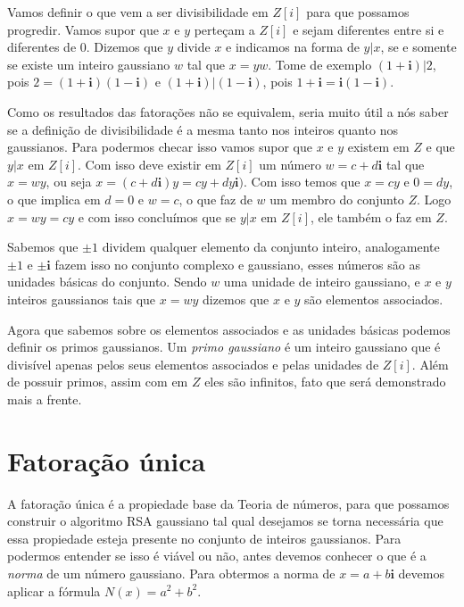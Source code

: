 Vamos definir o que vem a ser divisibilidade em $Z[i]$ para que possamos progredir. Vamos supor que $x$ e $y$ perte\c{c}am a $Z[i]$ e sejam diferentes entre si e diferentes de $0$. Dizemos que $y$ divide $x$ e indicamos na forma de $y|x$, se e somente se existe um inteiro gaussiano $w$ tal que $x=yw$. Tome de exemplo $(1 + \textbf{i})|2$, pois $ 2 = (1 + \textbf{i})(1 - \textbf{i})$ e $(1 + \textbf{i})|(1 - \textbf{i})$, pois $ 1 + \textbf{i} = \textbf{i}(1 - \textbf{i})$.

Como os resultados das fatora\c{c}\~oes n\~ao se equivalem, seria muito \'util a n\'os saber se a defini\c{c}\~ao de divisibilidade \'e a mesma tanto nos inteiros quanto nos gaussianos. Para podermos checar isso vamos supor que $x$ e $y$ existem em $Z$ e que $y|x$ em $Z[i]$. Com isso deve existir em $Z[i]$ um n\'umero $w = c + d\textbf{i}$ tal que $x=wy$, ou seja $x=(c + d\textbf{i})y = cy + dy\textbf{i})$. Com isso temos que $x=cy$ e $0 = dy$, o que implica em $d = 0$ e $w=c$, o que faz de $w$ um membro do conjunto $Z$. Logo $x=wy=cy$ e com isso conclu\'imos que se $y|x$ em $Z[i]$, ele tamb\'em o faz em $Z$.

Sabemos que $\pm 1$ dividem qualquer elemento da conjunto inteiro, analogamente $\pm 1$ e $\pm \textbf{i}$ fazem isso no conjunto complexo e gaussiano, esses n\'umeros s\~ao as unidades b\'asicas do conjunto. Sendo $w$ uma unidade de inteiro gaussiano, e $x$ e $y$ inteiros gaussianos tais que $x = wy$ dizemos que $x$ e $y$ s\~ao elementos associados.

Agora que sabemos sobre os elementos associados e as unidades b\'asicas podemos definir os primos gaussianos. Um \textit{primo gaussiano} \'e um inteiro gaussiano que \'e divis\'ivel apenas pelos seus elementos associados e pelas unidades de $Z[i]$. Al\'em de possuir primos, assim com em $Z$ eles s\~ao infinitos, fato que ser\'a demonstrado mais a frente.

\section{Fatora\c{c}\~ao \'unica}

\hspace{7mm}A fatora\c{c}\~ao \'unica \'e a propiedade base da Teoria de n\'umeros, para que possamos construir o algoritmo RSA gaussiano tal qual desejamos se torna necess\'aria que essa propiedade esteja presente no conjunto de inteiros gaussianos. Para podermos entender se isso \'e vi\'avel ou n\~ao, antes devemos conhecer o que \'e a \textit{norma} de um n\'umero gaussiano. Para obtermos a norma de $x=a+b\textbf{i}$ devemos aplicar a f\'ormula $N(x) = a^2 + b^2$.

